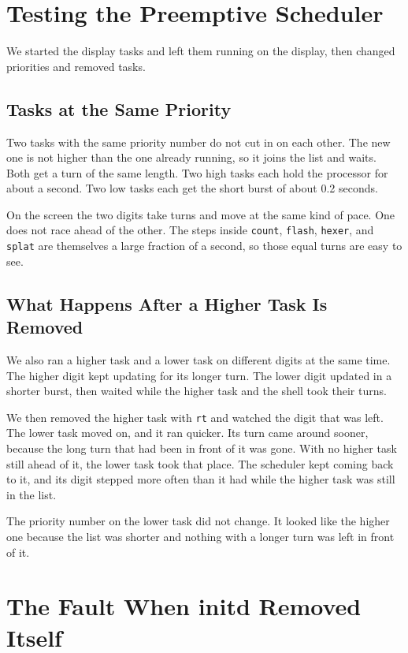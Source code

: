 \documentclass[conference,a4paper]{IEEEtran}
\begin{document}
\section{Testing the Preemptive Scheduler}


We started the display tasks and left them running on the display, then changed priorities and removed tasks.

\subsection{Tasks at the Same Priority}

Two tasks with the same priority number do not cut in on each other. The new one is not higher than the one already running, so it joins the list and waits. Both get a turn of the same length. Two high tasks each hold the processor for about a second. Two low tasks each get the short burst of about 0.2 seconds.

On the screen the two digits take turns and move at the same kind of pace. One does not race ahead of the other. The steps inside \texttt{count}, \texttt{flash}, \texttt{hexer}, and \texttt{splat} are themselves a large fraction of a second, so those equal turns are easy to see.

\subsection{What Happens After a Higher Task Is Removed}

We also ran a higher task and a lower task on different digits at the same time. The higher digit kept updating for its longer turn. The lower digit updated in a shorter burst, then waited while the higher task and the shell took their turns.

We then removed the higher task with \texttt{rt} and watched the digit that was left. The lower task moved on, and it ran quicker. Its turn came around sooner, because the long turn that had been in front of it was gone. With no higher task still ahead of it, the lower task took that place. The scheduler kept coming back to it, and its digit stepped more often than it had while the higher task was still in the list.

The priority number on the lower task did not change. It looked like the higher one because the list was shorter and nothing with a longer turn was left in front of it.

\section{The Fault When initd Removed Itself}
\label{sec:remove}
\end{document}
